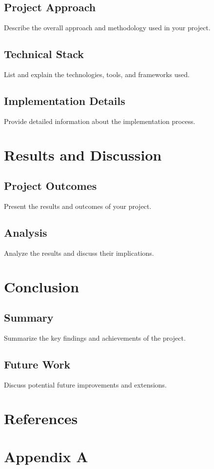 \documentclass[12pt,a4paper]{report}
\begin{document}
\section{Project Approach}
Describe the overall approach and methodology used in your project.

\section{Technical Stack}
List and explain the technologies, tools, and frameworks used.

\section{Implementation Details}
Provide detailed information about the implementation process.

\chapter{Results and Discussion}
\section{Project Outcomes}
Present the results and outcomes of your project.

\section{Analysis}
Analyze the results and discuss their implications.

\chapter{Conclusion}
\section{Summary}
Summarize the key findings and achievements of the project.

\section{Future Work}
Discuss potential future improvements and extensions.

\chapter{References}

\appendix
\chapter{Appendix A}
\end{document}
